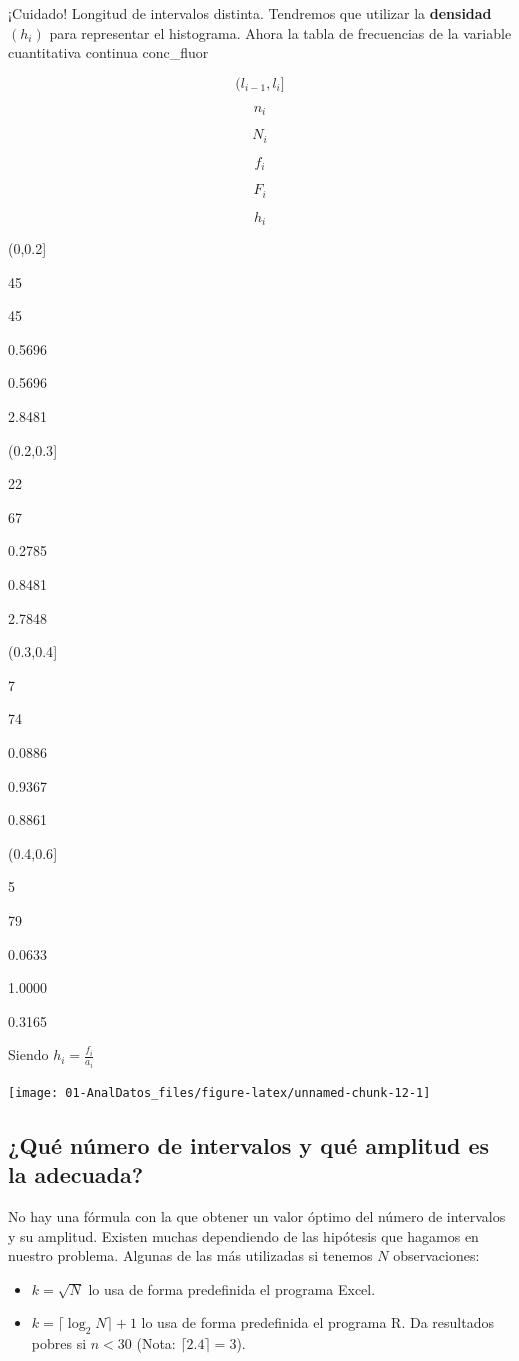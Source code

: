 \documentclass[]{book}
\providecommand{\tightlist}{%
  \setlength{\itemsep}{0pt}\setlength{\parskip}{0pt}}
\theoremstyle{definition}
\theoremstyle{definition}
\theoremstyle{definition}
\theoremstyle{remark}
\begin{document}
¡Cuidado! Longitud de intervalos distinta. Tendremos que utilizar la
\textbf{densidad} \((h_i)\) para representar el histograma. Ahora la
tabla de frecuencias de la variable cuantitativa continua conc\_fluor

\[ ( l_{i-1}, l_i  ] \]

\[n_i\]

\[N_i\]

\[f_i\]

\[F_i\]

\[h_i\]

(0,0.2{]}

45

45

0.5696

0.5696

2.8481

(0.2,0.3{]}

22

67

0.2785

0.8481

2.7848

(0.3,0.4{]}

7

74

0.0886

0.9367

0.8861

(0.4,0.6{]}

5

79

0.0633

1.0000

0.3165

Siendo \(h_i = \frac{f_i}{a_i}\)

\begin{center}\texttt{[image: 01-AnalDatos\_files/figure-latex/unnamed-chunk-12-1]} \end{center}

\subsection{¿Qué número de intervalos y qué amplitud es la
adecuada?}\label{que-numero-de-intervalos-y-que-amplitud-es-la-adecuada}

No hay una fórmula con la que obtener un valor óptimo del número de
intervalos y su amplitud. Existen muchas dependiendo de las hipótesis
que hagamos en nuestro problema. Algunas de las más utilizadas si
tenemos \(N\) observaciones:

\begin{itemize}
\tightlist
\item
  \(k = \sqrt{N}\) lo usa de forma predefinida el programa Excel.
\item
  \(k = \lceil \log_2 N \rceil +1\) lo usa de forma predefinida el
  programa R. Da resultados pobres si \(n<30\) (Nota:
  \(\lceil 2.4 \rceil = 3\)).
\end{itemize}
\end{document}
